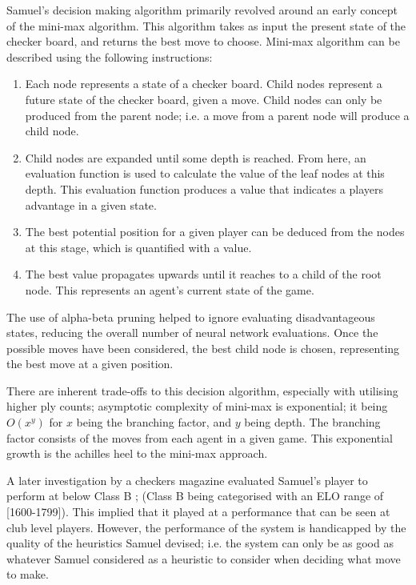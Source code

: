 \documentclass[12pt,a4paper]{article}
\begin{document}
        Samuel's decision making algorithm primarily revolved around an early concept of the mini-max algorithm. This algorithm takes as input the present state of the checker board, and returns the best move to choose. Mini-max algorithm can be described using the following instructions:
        
        \begin{enumerate}
            \item Each node represents a state of a checker board. Child nodes represent a future state of the checker board, given a move. Child nodes can only be produced from the parent node; i.e. a move from a parent node will produce a child node.
            \item Child nodes are expanded until some depth is reached. From here, an evaluation function is used to calculate the value of the leaf nodes at this depth. This evaluation function produces a value that indicates a players advantage in a given state.
            \item The best potential position for a given player can be deduced from the nodes at this stage, which is quantified with a value.
            \item The best value propagates upwards until it reaches to a child of the root node. This represents an agent's current state of the game.
        \end{enumerate}

        The use of alpha-beta pruning helped to ignore evaluating disadvantageous states, reducing the overall number of neural network evaluations. Once the possible moves have been considered, the best child node is chosen, representing the best move at a given position.
    
        There are inherent trade-offs to this decision algorithm, especially with utilising higher ply counts; asymptotic complexity of mini-max is exponential; it being $O(x^y)$ for $x$ being the branching factor, and $y$ being depth. The branching factor consists of the moves from each agent in a given game. This exponential growth is the achilles heel to the mini-max approach. 

        A later investigation by a checkers magazine evaluated Samuel's player to perform at below Class B \cite{schaeffer_one_1997,fogel_evolving_2000}; (Class B being categorised with an ELO range of [1600-1799]). This implied that it played at a performance that can be seen at club level players. However, the performance of the system is handicapped by the quality of the heuristics Samuel devised; i.e. the system can only be as good as whatever Samuel considered as a heuristic to consider when deciding what move to make.
\end{document}
